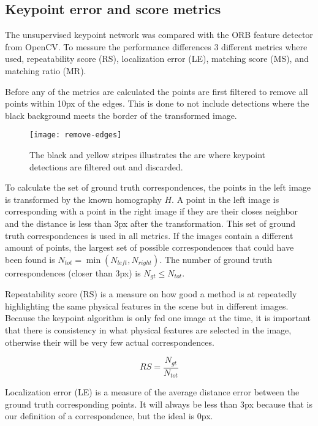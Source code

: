 \subsection{Keypoint error and score metrics}\label{sec:keypointmetrics}

The unsupervised keypoint network was compared with the ORB feature detector from OpenCV. To messure the performance differences 3 different metrics where used, repeatability score (RS), localization error (LE), matching score (MS), and matching ratio (MR).

Before any of the metrics are calculated the points are first filtered to remove all points within 10px of the edges. This is done to not include detections where the black background meets the border of the transformed image.

\begin{figure}[H]
	\centering
	\texttt{[image: remove-edges]}
	\caption{The black and yellow stripes illustrates the are where keypoint detections are filtered out and discarded.}
	\label{fig:remove-edges}
\end{figure}

To calculate the set of ground truth correspondences, the points in the left image is transformed by the known homography $H$. A point in the left image is corresponding with a point in the right image if they are their closes neighbor and the distance is less than 3px after the transformation. This set of ground truth correspondences is used in all metrics. If the images contain a different amount of points, the largest set of possible correspondences that could have been found is $N_{tot} = \min(N_{left}, N_{right})$. The number of ground truth correspondences (closer than 3px) is $N_{gt} \le N_{tot}$.

Repeatability score (RS) is a measure on how good a method is at repeatedly highlighting the same physical features in the scene but in different images. Because the keypoint algorithm is only fed one image at the time, it is important that there is consistency in what physical features are selected in the image, otherwise their will be very few actual correspondences.

\[
RS = \frac{N_{gt}}{N_{tot}} 
\]

Localization error (LE) is a measure of the average distance error between the ground truth corresponding points. It will always be less than 3px because that is our definition of a correspondence, but the ideal is 0px.


